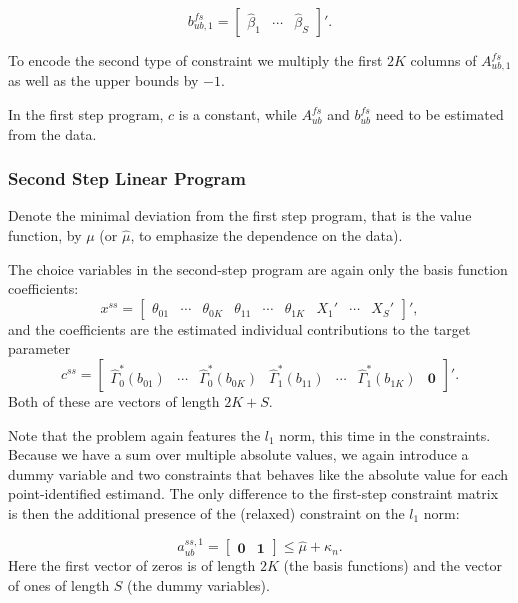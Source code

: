 \documentclass[12pt,a4paper,english]{article} %
\numberwithin{equation}{section}
\theoremstyle{definition}
\theoremstyle{remark}
\theoremstyle{plain}
\begin{document}
\begin{equation*}
  b_{ub, 1}^{fs} =
  \begin{bmatrix}
    \hat{\beta}_1 & \cdots & \hat{\beta}_S
  \end{bmatrix}'.
\end{equation*}

To encode the second type of constraint we multiply the first $2K$ columns of $A_{ub, 1}^{fs}$ as well as the upper bounds by $-1$.

In the first step program, $c$ is a constant, while $A_{ub}^{fs}$ and $b_{ub}^{fs}$ need to be estimated from the data.

\subsubsection{Second Step Linear Program}
Denote the minimal deviation from the first step program, that is the value function, by $\mu$ (or $\hat{\mu}$, to emphasize the dependence on the data).

The choice variables in the second-step program are again only the basis function coefficients:
\begin{equation*}
  x^{ss} =
  \begin{bmatrix}
     \theta_{01} & \cdots & \theta_{0K} & \theta_{11} & \cdots & \theta_{1K} & X_1' & \cdots & X_S'
  \end{bmatrix}',
\end{equation*}
and the coefficients are the estimated individual contributions to the target parameter
\begin{equation*}
  c^{ss} =
  \begin{bmatrix}
     \hat{\Gamma}_0^*(b_{01}) & \cdots & \hat{\Gamma}_0^*(b_{0K}) & \hat{\Gamma}_1^*(b_{11}) & \cdots & \hat{\Gamma}_1^*(b_{1K}) & \mathbf{0}
  \end{bmatrix}'.
\end{equation*}
Both of these are vectors of length $2K + S$.

Note that the problem again features the $l_1$ norm, this time in the constraints.
Because we have a sum over multiple absolute values, we again introduce a dummy variable and two constraints that behaves like the absolute value for each point-identified estimand.
The only difference to the first-step constraint matrix is then the additional presence of the (relaxed) constraint on the $l_1$ norm:

\begin{equation*}
  a_{ub}^{ss, 1} = \begin{bmatrix}
    \mathbf{0} & \mathbf{1}
  \end{bmatrix}
  \leq \hat{\mu} + \kappa_n.
\end{equation*}
Here the first vector of zeros is of length $2K$ (the basis functions) and the vector of ones of length $S$ (the dummy variables).
\end{document}
